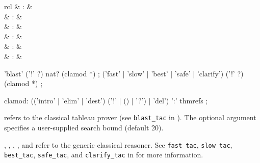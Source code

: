 \begin{isabellebody}
\begin{isamarkuptext}
\begin{descr}
  \end{descr}%
\end{isamarkuptext}%
\isamarkuptrue%
%
\isamarkuptrue%
%
\begin{isamarkuptext}%
\begin{matharray}{rcl}
    \mbox{} & : & \isarmeth \\
    \mbox{} & : & \isarmeth \\
    \mbox{} & : & \isarmeth \\
    \mbox{} & : & \isarmeth \\
    \mbox{} & : & \isarmeth \\
    \mbox{} & : & \isarmeth \\
  \end{matharray}

  \begin{rail}
    'blast' ('!' ?) nat? (clamod *)
    ;
    ('fast' | 'slow' | 'best' | 'safe' | 'clarify') ('!' ?) (clamod *)
    ;

    clamod: (('intro' | 'elim' | 'dest') ('!' | () | '?') | 'del') ':' thmrefs
    ;
  \end{rail}

  \begin{descr}

  \item [\mbox{\isa{blast}}] refers to the classical tableau prover (see
  \verb|blast_tac| in \cite[\S11]{isabelle-ref}).  The optional
  argument specifies a user-supplied search bound (default 20).

  \item [\mbox{\isa{fast}}, \mbox{\isa{slow}}, \mbox{\isa{best}}, \mbox{\isa{safe}}, and \mbox{\isa{clarify}}] refer to the generic classical
  reasoner.  See \verb|fast_tac|, \verb|slow_tac|, \verb|best_tac|, \verb|safe_tac|, and \verb|clarify_tac| in \cite[\S11]{isabelle-ref} for
  more information.

  \end{descr}


\end{isamarkuptext}
\end{isabellebody}
